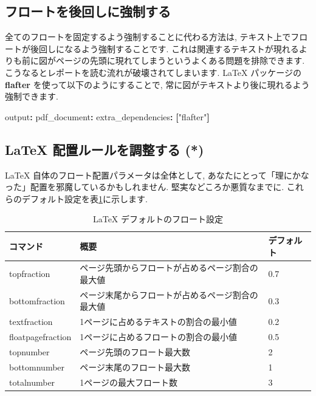 \documentclass[
  11pt,
]{bxjsreport}
\newenvironment{Shaded}{\begin{snugshade}}{\end{snugshade}}
\newcommand{\AttributeTok}[1]{\textcolor[rgb]{0.77,0.63,0.00}{#1}}
\newcommand{\FunctionTok}[1]{\textcolor[rgb]{0.00,0.00,0.00}{#1}}
\newcommand{\KeywordTok}[1]{\textcolor[rgb]{0.13,0.29,0.53}{\textbf{#1}}}
\newcommand{\StringTok}[1]{\textcolor[rgb]{0.31,0.60,0.02}{#1}}
\begin{document}
\hypertarget{force-floats-forward}{%
\subsection{フロートを後回しに強制する}\label{force-floats-forward}}

全てのフロートを固定するよう強制することに代わる方法は, テキスト上でフロートが後回しになるよう強制することです. これは関連するテキストが現れるよりも前に図がページの先頭に現れてしまうというよくある問題を排除できます. こうなるとレポートを読む流れが破壊されてしまいます. LaTeX パッケージの \textbf{flafter} を使って以下のようにすることで, 常に図がテキストより後に現れるよう強制できます.

\begin{Shaded}
\begin{Highlighting}[]
\FunctionTok{output}\KeywordTok{:}\AttributeTok{ }
\AttributeTok{  }\FunctionTok{pdf\_document}\KeywordTok{:}
\AttributeTok{    }\FunctionTok{extra\_dependencies}\KeywordTok{:}\AttributeTok{ }\KeywordTok{[}\StringTok{"flafter"}\KeywordTok{]}
\end{Highlighting}
\end{Shaded}

\hypertarget{latex-ux914dux7f6eux30ebux30fcux30ebux3092ux8abfux6574ux3059ux308b}{%
\subsection{LaTeX 配置ルールを調整する (*)}\label{latex-ux914dux7f6eux30ebux30fcux30ebux3092ux8abfux6574ux3059ux308b}}

LaTeX 自体のフロート配置パラメータは全体として, あなたにとって「理にかなった」配置を邪魔しているかもしれません. 堅実などころか悪質なまでに. これらのデフォルト設定を表\ref{tab:float-default}に示します.

\begin{table}

\caption{\label{tab:float-default}LaTeX デフォルトのフロート設定}
\centering
\begin{tabular}[t]{l|l|l}
\hline
コマンド & 概要 & デフォルト\\
\hline
topfraction & ページ先頭からフロートが占めるページ割合の最大値 & 0.7\\
\hline
bottomfraction & ページ末尾からフロートが占めるページ割合の最大値 & 0.3\\
\hline
textfraction & 1ページに占めるテキストの割合の最小値 & 0.2\\
\hline
floatpagefraction & 1ページに占めるフロートの割合の最小値 & 0.5\\
\hline
topnumber & ページ先頭のフロート最大数 & 2\\
\hline
bottomnumber & ページ末尾のフロート最大数 & 1\\
\hline
totalnumber & 1ページの最大フロート数 & 3\\
\hline
\end{tabular}
\end{table}
\end{document}
